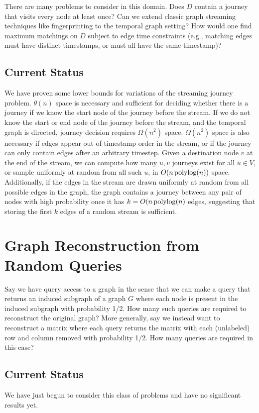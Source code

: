 There are many problems to consider in this domain. Does $D$ contain a journey that visits every node at least once?  Can we extend classic graph streaming techniques like fingerprinting to the temporal graph setting?  How would one find maximum matchings on $D$ subject to edge time constraints (e.g., matching edges must have distinct timestamps, or must all have the same timestamp)?

\subsection*{Current Status}
We have proven some lower bounds for variations of the streaming journey problem.  $\theta(n)$ space is necessary and sufficient for deciding whether there is a journey if we know the start node of the journey before the stream.  If we do not know the start or end node of the journey before the stream, and the temporal graph is directed, journey decision requires $\Omega(n^2)$ space.  $\Omega(n^2)$ space is also necessary if edges appear out of timestamp order in the stream, or if the journey can only contain edges after an arbitrary timestep. Given a destination node $v$ at the end of the stream, we can compute how many $u,v$ journeys exist for all $u \in V$, or sample uniformly at random from all such $u$, in $O(n \operatorname{polylog}(n))$ space.  Additionally, if the edges in the stream are drawn uniformly at random from all possible edges in the graph, the graph contains a journey between any pair of nodes with high probability once it has $k = O(n \operatorname{polylog}(n)$ edges, suggesting that storing the first $k$ edges of a random stream is sufficient.

\section{Graph Reconstruction from Random Queries}
\label{sec:reconstruct}

Say we have query access to a graph in the sense that we can make a query that returns an induced subgraph of a graph $G$ where each node is present in the induced subgraph with probability 1/2. How many such queries are required to reconstruct the original graph? More generally, say we instead want to reconstruct a matrix where each query returns the matrix with each (unlabeled) row and column removed with probability 1/2. How many queries are required in this case?

\subsection*{Current Status}
We have just begun to consider this class of problems and have no significant results yet.